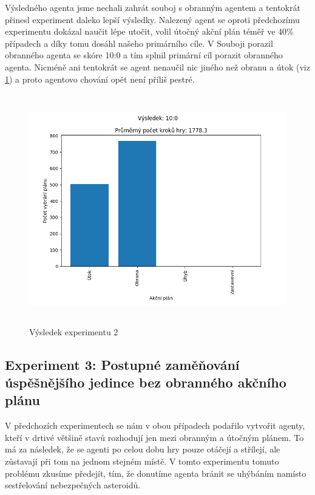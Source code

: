 Výsledného agenta jsme nechali zahrát souboj s obranným agentem a tentokrát přinesl experiment daleko lepší výsledky.
Nalezený agent se oproti předchozímu experimentu dokázal naučit lépe utočit, volil útočný akční plán téměř ve 40\% případech a díky tomu dosáhl našeho primárního cíle. V Souboji porazil obranného agenta se skóre 10:0 a tím splnil primární cíl porazit obranného agenta.
Nicméně ani tentokrát se agent nenaučil nic jiného než obranu a útok (viz \ref{Výsledek experimentu 02}) a proto agentovo chování opět není příliš pestré. 

\newpage

 


\begin{figure}[H]\centering
\includegraphics[width=125mm, height=100mm]{./Obrazky/Experiment02Results.png}
\caption{Výsledek experimentu 2}
\label{Výsledek experimentu 02}
\end{figure}




\newpage
\subsection{Experiment 3: Postupné zaměňování úspěšnějšího jedince bez obranného akčního plánu}

V předchozích experimentech se nám v obou případech podařilo vytvořit agenty, kteří v drtivé většině stavů rozhodují jen mezi obranným a útočným plánem.
To má za následek, že se agenti po celou dobu hry pouze otáčejí a střílejí, ale zůstavají při tom na jednom stejném místě.
V tomto experimentu tomuto problému zkusíme předejít, tím, že donutíme agenta bránit se uhýbáním namísto sestřelování nebezpečných asteroidů.

